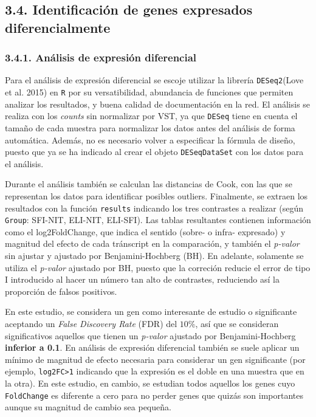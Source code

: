 \documentclass[
]{article}
\begin{document}
\hypertarget{identificaciuxf3n-de-genes-expresados-diferencialmente}{%
\subsection{3.4. Identificación de genes expresados
diferencialmente}\label{identificaciuxf3n-de-genes-expresados-diferencialmente}}

\hypertarget{anuxe1lisis-de-expresiuxf3n-diferencial}{%
\subsubsection{3.4.1. Análisis de expresión
diferencial}\label{anuxe1lisis-de-expresiuxf3n-diferencial}}

Para el análisis de expresión diferencial se escoje utilizar la librería
\texttt{DESeq2}(Love et al. 2015) en \texttt{R} por su versatibilidad,
abundancia de funciones que permiten analizar los resultados, y buena
calidad de documentación en la red. El análisis se realiza con los
\emph{counts} sin normalizar por VST, ya que \texttt{DESeq} tiene en
cuenta el tamaño de cada muestra para normalizar los datos antes del
análisis de forma automática. Además, no es necesario volver a
especificar la fórmula de diseño, puesto que ya se ha indicado al crear
el objeto \texttt{DESeqDataSet} con los datos para el análisis.

Durante el análisis también se calculan las distancias de Cook, con las
que se representan los datos para identificar posibles outliers.
Finalmente, se extraen los resultados con la función \texttt{results}
indicando los tres contrastes a realizar (según \texttt{Group}: SFI-NIT,
ELI-NIT, ELI-SFI). Las tablas resultantes contienen información como el
log2FoldChange, que indica el sentido (sobre- o infra- expresado) y
magnitud del efecto de cada tránscript en la comparación, y también el
\emph{p-valor} sin ajustar y ajustado por Benjamini-Hochberg (BH). En
adelante, solamente se utiliza el \emph{p-valor} ajustado por BH, puesto
que la correción reducie el error de tipo I introducido al hacer un
número tan alto de contrastes, reduciendo así la proporción de falsos
positivos.

En este estudio, se considera un gen como interesante de estudio o
significante aceptando un \emph{False Discovery Rate} (FDR) del
\(10\%\), así que se consideran significativos aquellos que tienen un
\emph{p-valor} ajustado por Benjamini-Hochberg \textbf{inferior a 0.1}.
En análisis de expresión diferencial también se suele aplicar un mínimo
de magnitud de efecto necesaria para considerar un gen significante (por
ejemplo, \texttt{log2FC\textgreater{}1} indicando que la expresión es el
doble en una muestra que en la otra). En este estudio, en cambio, se
estudian todos aquellos los genes cuyo \texttt{FoldChange} es diferente
a cero para no perder genes que quizás son importantes aunque su
magnitud de cambio sea pequeña.
\end{document}
